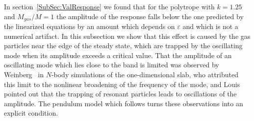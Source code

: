 In section~\ref{SubSec:ValResponse} we found that for the polytrope with $k = 1.25$ and $M_{gas}/M = 1$ the amplitude of the response falls below the one predicted by the linearized equations by an amount which depends on $\varepsilon$ and which is not a numerical artifact. In this subsection we show that this effect is caused by the gas particles near the edge of the steady state, which are trapped by the oscillating mode when its amplitude exceeds a critical value. That the amplitude of an oscillating mode which lies close to the band is limited was observed by Weinberg~\cite{mW91} in $N$-body simulations of the one-dimensional slab, who attributed this limit to the nonlinear broadening of the frequency of the mode, and Louis~\cite{pL92} pointed out that the trapping of resonant particles leads to oscillations of the amplitude. The pendulum model which follows turns these observations into an explicit condition.

